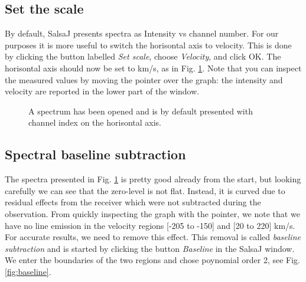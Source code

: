 \documentclass[11pt,a4paper]{article}
\begin{document}
\subsection{Set the scale}
By default, SalsaJ presents spectra as Intensity vs channel number. For our
purposes it is more useful to switch the horisontal axis to velocity. This is
done by clicking the button labelled \emph{Set scale}, choose \emph{Velocity},
and click OK. The horisontal axis should now be set to km/s, as in Fig.
\ref{fig:velocity}. Note that you can inspect the measured values by moving the
pointer over the graph: the intensity and velocity are reported in the lower part
of the window.
\begin{figure}[h!]
  \centering
  \caption{A spectrum has been opened and is by default presented with channel
  index on the horisontal axis.}
  \label{fig:velocity}
\end{figure}

\subsection{Spectral baseline subtraction}
The spectra presented in Fig. \ref{fig:velocity} is pretty good already from 
the start, but looking carefully we can see that the zero-level is not flat. 
Instead, it is curved due to residual effects from the receiver which were
not subtracted during the observation. From quickly inspecting the graph 
with the pointer, we note that we have no line emission in the velocity regions
[-205 to -150] and [20 to 220] km/s. For accurate results, we need to 
remove this effect. This removal is called \emph{baseline subtraction} and 
is started by clicking the button \emph{Baseline} in the SalsaJ window.
We enter the boundaries of the two regions and chose poynomial order 2, 
see Fig. \ref{fig:baseline}.
\end{document}
